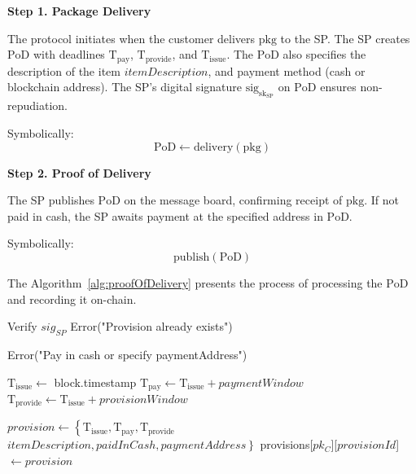 \documentclass[pdftex,twocolumn,epjc3]{svjour3}
\begin{document}
\noindent \textbf{Step 1. Package Delivery}\label{step-1-package-delivery}

The protocol initiates when the customer delivers $\mathrm{pkg}$ to the SP. The SP creates $\mathrm{PoD}$ with deadlines $\mathrm{T}_\mathrm{pay}$, $\mathrm{T}_\mathrm{provide}$, and $\mathrm{T}_\mathrm{issue}$. The $\mathrm{PoD}$ also specifies the description of the item $itemDescription$, and payment method (cash or blockchain address). The SP's digital signature $\mathrm{sig}_{\mathrm{sk}_\mathrm{SP}}$ on $\mathrm{PoD}$ ensures non-repudiation.

Symbolically: 
\[
\mathrm{PoD \gets delivery(pkg)}
\]

\noindent \textbf{Step 2. Proof of Delivery}\label{step-2-pod}

The SP publishes $\mathrm{PoD}$ on the message board, confirming receipt of $\mathrm{pkg}$. If not paid in cash, the SP awaits payment at the specified address in $\mathrm{PoD}$.

Symbolically: 
\[
\mathrm{publish(PoD)}
\]

The Algorithm~\ref{alg:proofOfDelivery} presents the process of processing the $\mathrm{PoD}$ and recording it on-chain.

\begin{algorithm}
\caption{Algorithm for Registering Proof of Delivery}
\label{alg:proofOfDelivery}
\begin{algorithmic}[1]
    \State Verify $sig_{SP}$
        \State \Return Error("Provision already exists")
    \EndIf

        \State \Return Error("Pay in cash or specify paymentAddress")
    \EndIf
    
    \State $\mathrm{T}_\mathrm{issue} \gets$ block.timestamp
    \State $\mathrm{T}_\mathrm{pay} \gets \mathrm{T}_\mathrm{issue} + paymentWindow$
    \State $\mathrm{T}_\mathrm{provide} \gets \mathrm{T}_\mathrm{issue} + provisionWindow$

    \State $provision \gets \left\{ \mathrm{T}_\mathrm{issue}, \mathrm{T}_\mathrm{pay}, \mathrm{T}_\mathrm{provide} \right.$
    \State \hspace{\algorithmicindent}$\left. itemDescription, paidInCash, paymentAddress \right\}$
    \State provisions[$pk_C$][$provisionId$] $\gets provision$
\EndFunction
\end{algorithmic}
\end{algorithm}
\end{document}
